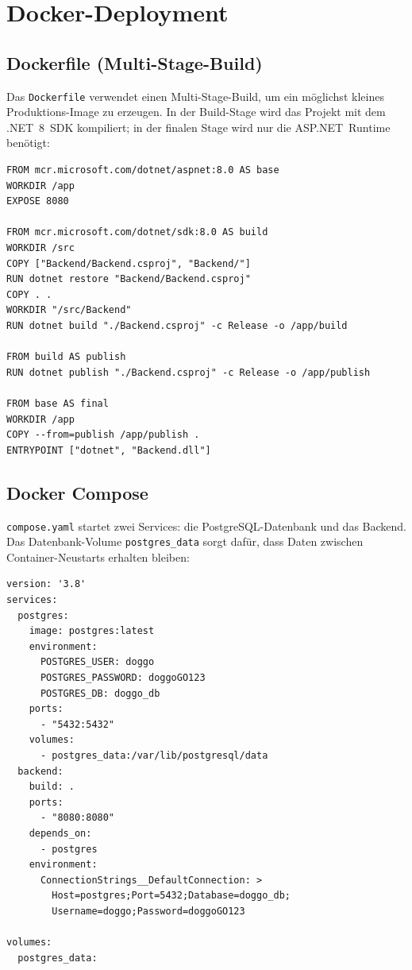\section{Docker-Deployment}
\label{sec:docker}

\subsection{Dockerfile (Multi-Stage-Build)}
\label{subsec:dockerfile}

Das \texttt{Dockerfile} verwendet einen Multi-Stage-Build, um ein möglichst kleines
Produktions-Image zu erzeugen. In der Build-Stage wird das Projekt mit dem .NET~8~SDK
kompiliert; in der finalen Stage wird nur die ASP.NET~Runtime benötigt:

\begin{lstlisting}[language={}, caption={Dockerfile – Multi-Stage-Build (Auszug)}, label=lst:dockerfile, float=htbp]
FROM mcr.microsoft.com/dotnet/aspnet:8.0 AS base
WORKDIR /app
EXPOSE 8080

FROM mcr.microsoft.com/dotnet/sdk:8.0 AS build
WORKDIR /src
COPY ["Backend/Backend.csproj", "Backend/"]
RUN dotnet restore "Backend/Backend.csproj"
COPY . .
WORKDIR "/src/Backend"
RUN dotnet build "./Backend.csproj" -c Release -o /app/build

FROM build AS publish
RUN dotnet publish "./Backend.csproj" -c Release -o /app/publish

FROM base AS final
WORKDIR /app
COPY --from=publish /app/publish .
ENTRYPOINT ["dotnet", "Backend.dll"]
\end{lstlisting}

\subsection{Docker Compose}
\label{subsec:compose}

\texttt{compose.yaml} startet zwei Services: die PostgreSQL-Datenbank und das Backend.
Das Datenbank-Volume \texttt{postgres\_data} sorgt dafür, dass Daten zwischen Container-Neustarts
erhalten bleiben:

\begin{lstlisting}[language={}, caption={compose.yaml}, label=lst:compose, float=htbp]
version: '3.8'
services:
  postgres:
    image: postgres:latest
    environment:
      POSTGRES_USER: doggo
      POSTGRES_PASSWORD: doggoGO123
      POSTGRES_DB: doggo_db
    ports:
      - "5432:5432"
    volumes:
      - postgres_data:/var/lib/postgresql/data
  backend:
    build: .
    ports:
      - "8080:8080"
    depends_on:
      - postgres
    environment:
      ConnectionStrings__DefaultConnection: >
        Host=postgres;Port=5432;Database=doggo_db;
        Username=doggo;Password=doggoGO123

volumes:
  postgres_data:
\end{lstlisting}

